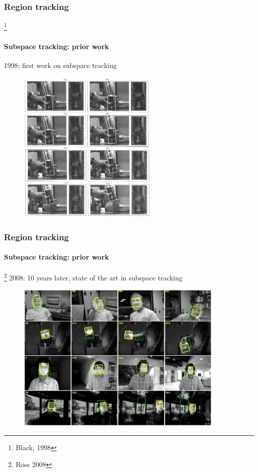 \begin{frame}
\frametitle{Region tracking}\footnote{Black, 1998}
\framesubtitle{Subspace tracking: prior work}
\mypagenum
\vspace{0.1in}
1998: first work on subspace tracking
	\begin{figure}
		\includegraphics[width=0.6\textwidth]{thesis/TrackingPapers_SubspaceTracking_1998_Black_fig9.png}
	\end{figure}
\end{frame}



\begin{frame}
\frametitle{Region tracking}
\framesubtitle{Subspace tracking: prior work}
\footnote{Ross 2008}
\mypagenum
\vspace{0.1in}
2008: 10 years later, state of the art in subspace tracking
\begin{figure}
\includegraphics[width=0.9\textwidth]{thesis/TrackingPapers_SubspaceTracking_2008_Ross_fig10.png}
\end{figure}
\end{frame}






